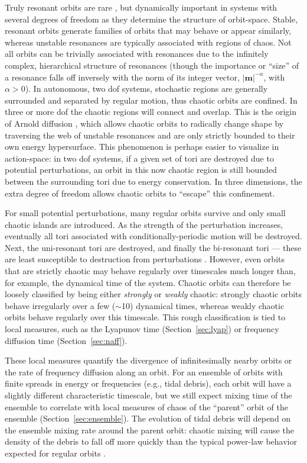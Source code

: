 \documentclass[letterpaper,12pt,preprint]{aastex}
\newcommand{\bs}[1]{\boldsymbol{#1}}
\begin{document}
Truly resonant orbits are rare \citep{merritt99}, but dynamically important in systems with several degrees of freedom as they determine the structure of orbit-space. Stable, resonant orbits generate families of orbits that may behave or appear similarly, whereas unstable resonances are typically associated with regions of chaos. Not all orbits can be trivially associated with resonances due to the infinitely complex, hierarchical structure of resonances (though the importance or ``size'' of a resonance falls off inversely with the norm of its integer vector, $|\bs{m}|^{-\alpha}$, with $\alpha > 0$). In autonomous, two dof systems, stochastic regions are generally surrounded and separated by regular motion, thus chaotic orbits are confined. In three or more dof the chaotic regions will connect and overlap. This is the origin of Arnold diffusion \citep{arnold64}, which allows chaotic orbits to radically change shape by traversing the web of unstable resonances and are only strictly bounded to their own energy hypersurface. This phenomenon is perhaps easier to visualize in action-space: in two dof systems, if a given set of tori are destroyed due to potential perturbations, an orbit in this now chaotic region is still bounded between the surrounding tori due to energy conservation. In three dimensions, the extra degree of freedom allows chaotic orbits to ``escape'' this confinement.

For small potential perturbations, many regular orbits survive and only small chaotic islands are introduced. As the strength of the perturbation increases, eventually all tori associated with conditionally-periodic motion will be destroyed. Next, the uni-resonant tori are destroyed, and finally the bi-resonant tori --- these are least susceptible to destruction from perturbations \citep[e.g., see][]{valluri98}. However, even orbits that are strictly chaotic may behave regularly over timescales much longer than, for example, the dynamical time of the system. Chaotic orbits can therefore be loosely classified by being either \emph{strongly} or \emph{weakly} chaotic: strongly chaotic orbits behave irregularly over a few ($\sim$10) dynamical times, whereas weakly chaotic orbits behave regularly over this timescale. This rough classification is tied to local measures, such as the Lyapunov time (Section~\ref{sec:lyap}) or frequency diffusion time (Section~\ref{sec:naff}). 

These local measures quantify the divergence of infinitesimally nearby orbits or the rate of frequency diffusion along an orbit. For an ensemble of orbits with finite spreads in energy or frequencies (e.g., tidal debris), each orbit will have a slightly different characteristic timescale, but we still expect mixing time of the ensemble to correlate with local measures of chaos of the ``parent'' orbit of the ensemble (Section~\ref{sec:ensemble}). The evolution of tidal debris will depend on the ensemble mixing rate around the parent orbit: chaotic mixing will cause the density of the debris to fall off more quickly than the typical power-law behavior expected for regular orbits \citep[e.g.,][]{merritt96, helmi99}. 
\end{document}
